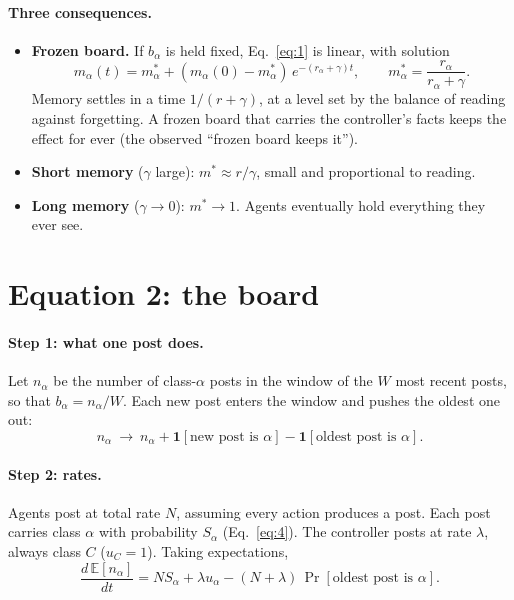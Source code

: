 \documentclass[10pt,a4paper]{article}
\begin{document}
\paragraph{Three consequences.}
\begin{itemize}
\item \textbf{Frozen board.} If $b_\alpha$ is held fixed, Eq.~\eqref{eq:1} is linear, with solution
  \begin{equation}
  m_\alpha(t)=m_\alpha^*+(m_\alpha(0)-m_\alpha^*)\,e^{-(r_\alpha+\gamma)t},\qquad m_\alpha^*=\frac{r_\alpha}{r_\alpha+\gamma}.\label{eq:frozen}
  \end{equation}
  Memory settles in a time $1/(r+\gamma)$, at a level set by the balance of reading against forgetting. A frozen board
  that carries the controller's facts keeps the effect for ever (the observed ``frozen board keeps it'').
\item \textbf{Short memory} ($\gamma$ large): $m^*\approx r/\gamma$, small and proportional to reading.
\item \textbf{Long memory} ($\gamma\to0$): $m^*\to1$. Agents eventually hold everything they ever see.
\end{itemize}

\section{Equation 2: the board}
\label{sec:eq2}
\paragraph{Step 1: what one post does.} Let $n_\alpha$ be the number of class-$\alpha$ posts in the window of the $W$ most
recent posts, so that $b_\alpha=n_\alpha/W$. Each new post enters the window and pushes the oldest one out:
\begin{equation}
n_\alpha\ \to\ n_\alpha+\mathbf 1[\text{new post is }\alpha]-\mathbf 1[\text{oldest post is }\alpha].
\end{equation}

\paragraph{Step 2: rates.} Agents post at total rate $N$, assuming every action produces a post. Each post carries class
$\alpha$ with probability $S_\alpha$ (Eq.~\ref{eq:4}). The controller posts at rate $\lambda$, always class $C$
($u_C=1$). Taking expectations,
\begin{equation}
\frac{d\,\mathbb E[n_\alpha]}{dt}=N S_\alpha+\lambda u_\alpha-(N+\lambda)\,\Pr[\text{oldest post is }\alpha].
\end{equation}
\end{document}
